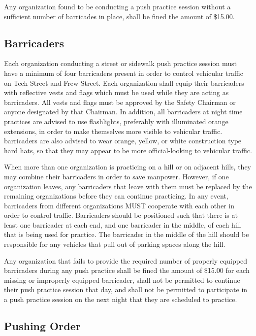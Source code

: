 	Any organization found to be conducting a push practice session without a sufficient number of barricades in place, shall be fined the amount of \$15.00.

\subsection{Barricaders}

	Each organization conducting a street or sidewalk push practice session must have a minimum of four barricaders present in order to control vehicular traffic on Tech Street and Frew Street. Each organization shall equip their barricaders with reflective vests and flags which must be used while they are acting as barricaders. All vests and flags must be approved by the Safety Chairman or anyone designated by that Chairman. In addition, all barricaders at night time practices are advised to use flashlights, preferably with illuminated orange extensions, in order to make themselves more visible to vehicular traffic. barricaders are also advised to wear orange, yellow, or white construction type hard hats, so that they may appear to be more official-looking to vehicular traffic.

	When more than one organization is practicing on a hill or on adjacent hills, they may combine their barricaders in order to save manpower. However, if one organization leaves, any barricaders that leave with them must be replaced by the remaining organizations before they can continue practicing. In any event, barricaders from different organizations MUST cooperate with each other in order to control traffic. Barricaders should be positioned such that there is at least one barricader at each end, and one barricader in the middle, of each hill that is being used for practice. The barricader in the middle of the hill should be responsible for any vehicles that pull out of parking spaces along the hill.

	Any organization that fails to provide the required number of properly equipped barricaders during any push practice shall be fined the amount of \$15.00 for each missing or improperly equipped barricader, shall not be permitted to continue their push practice session that day, and shall not be permitted to participate in a push practice session on the next night that they are scheduled to practice.

\subsection{Pushing Order}

